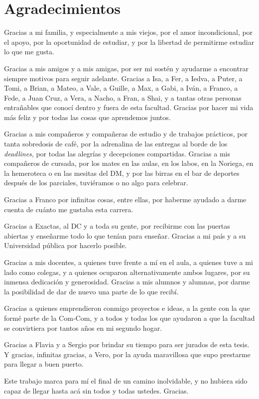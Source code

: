 \chapter*{Agradecimientos}

Gracias a mi familia, y especialmente a mis viejos, por el amor incondicional,
por el apoyo, por la oportunidad de estudiar, y por la libertad de permitirme
estudiar lo que me gusta.

Gracias a mis amigos y a mis amigas, por ser mi sostén y ayudarme a encontrar
siempre motivos para seguir adelante.
Gracias a Isa, a Fer, a Iedva, a Puter, a Tomi, a Brian, a Mateo, a Vale,
a Guille, a Max, a Gabi, a Iván, a Franco, a Fede, a Juan Cruz, a Vera, a Nacho,
a Fran, a Shai, y a tantas otras personas entrañables que conocí
dentro y fuera de esta facultad.
Gracias por hacer mi vida más feliz y por todas las cosas que aprendemos juntos.

Gracias a mis compañeros y compañeras de estudio y de trabajos prácticos, por
tanta sobredosis de café, por la adrenalina de las entregas al borde de los
\emph{deadlines}, por todas las alegrías y decepciones compartidas.
Gracias a mis compañeros de cursada, por los mates en las aulas, en los labos,
en la Noriega, en la hemeroteca o en las mesitas del DM, y por las birras en el
bar de deportes después de los parciales, tuviéramos o no algo para celebrar.

Gracias a Franco por infinitas cosas, entre ellas, por haberme ayudado a darme
cuenta de cuánto me gustaba esta carrera.

Gracias a Exactas, al DC y a toda su gente, por recibirme con las puertas
abiertas y enseñarme todo lo que tenían para enseñar. Gracias a mi país y a su
Universidad pública por hacerlo posible.

Gracias a mis docentes, a quienes tuve frente a mí en el aula, a quienes tuve a
mi lado como colegas, y a quienes ocuparon alternativamente ambos lugares,
por su inmensa dedicación y
generosidad.
Gracias a mis alumnos y alumnas, por darme la posibilidad de dar de nuevo una
parte de lo que recibí.

Gracias a quienes emprendieron conmigo proyectos e ideas, a la gente con la que
formé parte de la Com-Com, y a todos y todas los que ayudaron a que la facultad
se convirtiera por tantos años en mi segundo hogar.

Gracias a Flavia y a Sergio por brindar su tiempo para ser jurados de esta
tesis.
Y gracias, infinitas gracias, a Vero, por la ayuda maravillosa que supo
prestarme para llegar a buen puerto.

Este trabajo marca para mí el final de un camino inolvidable, y no hubiera sido
capaz de llegar hasta acá sin todos y todas ustedes. Gracias.
